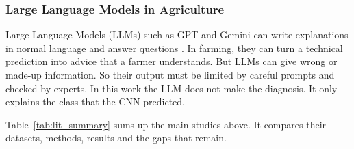\subsubsection{Large Language Models in Agriculture}
Large Language Models (LLMs) such as GPT and Gemini can write explanations in normal language and answer questions \cite{google2026gemini}. In farming, they can turn a technical prediction into advice that a farmer understands. But LLMs can give wrong or made-up information. So their output must be limited by careful prompts and checked by experts. In this work the LLM does not make the diagnosis. It only explains the class that the CNN predicted.

Table~\ref{tab:lit_summary} sums up the main studies above. It compares their datasets, methods, results and the gaps that remain.

